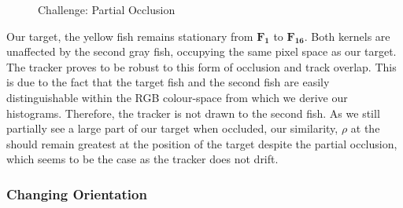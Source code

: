 \begin{figure}
{\begin{tabular}{cccc}
        \end{tabular}}
    \caption{Challenge: Partial Occlusion\label{fig:mean_shift_partial_occlusion}
 }
\end{figure}

Our target, the yellow fish remains stationary from
$\mathbf{F_{1}}$ to $\mathbf{F_{16}}$. Both kernels are unaffected by the second
gray fish, occupying the same pixel space as our target. The tracker proves to be
robust to this form of occlusion and track overlap.
This is due to the fact that the target fish and the second fish are easily
distinguishable within the RGB colour-space from which we derive our histograms.
Therefore, the tracker is not drawn to the second fish.
As we still partially see a large part of our target when occluded, our
similarity, $\rho$ at the should remain greatest at the position of the target
despite the partial occlusion, which seems to be the case as the tracker does
not drift.

\subsubsection{Changing Orientation}

